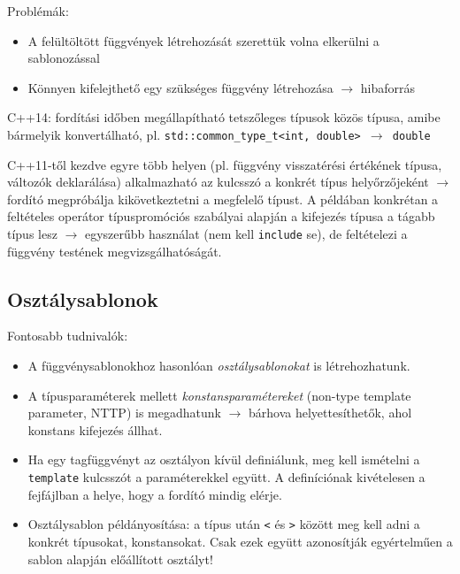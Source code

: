 \documentclass[usenames,dvipsnames,aspectratio=169]{beamer}
\begin{document}
\begin{frame}
    Problémák:
    \begin{itemize}
        \item A felültöltött függvények létrehozását szerettük volna elkerülni a sablonozással
        \item Könnyen kifelejthető egy szükséges függvény létrehozása $\to$ hibaforrás
    \end{itemize}
    C++14: fordítási időben megállapítható tetszőleges típusok közös típusa, amibe bármelyik konvertálható, pl. \texttt{std::common\_type\_t<int, double> $\to$ double}
    \begin{exampleblock}{}
        \small
        
    \end{exampleblock}
\end{frame}

\begin{frame}
    C++11-től kezdve egyre több helyen (pl. függvény visszatérési értékének típusa, változók deklarálása) alkalmazható az  kulcsszó a konkrét típus helyőrzőjeként $\to$ fordító megpróbálja kikövetkeztetni a megfelelő típust. A példában konkrétan a feltételes operátor típuspromóciós szabályai alapján a kifejezés típusa a tágabb típus lesz $\to$ egyszerűbb használat (nem kell \texttt{include} se), de feltételezi a függvény testének megvizsgálhatóságát.
    \begin{exampleblock}{}
        \small
        
    \end{exampleblock}
\end{frame}

\subsection{Osztálysablonok}

\begin{frame}
    Fontosabb tudnivalók:
    \begin{itemize}
        \item A függvénysablonokhoz hasonlóan \emph{osztálysablonokat} is létrehozhatunk.
        \item A típusparaméterek mellett \emph{konstansparamétereket} (non-type template parameter, NTTP) is megadhatunk $\to$ bárhova helyettesíthetők, ahol konstans kifejezés állhat.
        \item Ha egy tagfüggvényt az osztályon kívül definiálunk, meg kell ismételni a \texttt{template} kulcsszót a paraméterekkel együtt. A definíciónak kivételesen a fejfájlban a helye, hogy a fordító mindig elérje.
        \item Osztálysablon példányosítása: a típus után \texttt{<} és \texttt{>} között meg kell adni a konkrét típusokat, konstansokat. Csak ezek együtt azonosítják egyértelműen a sablon alapján előállított osztályt!
    \end{itemize}
\end{frame}
\end{document}

